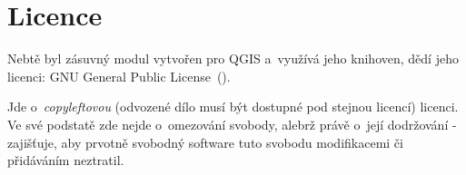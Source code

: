 \section{Licence}
\label{licence}

Nebtě byl zásuvný modul vytvořen pro QGIS a~využívá jeho knihoven, dědí jeho licenci: GNU General Public
License~(). 

Jde o~\textit{copyleftovou} (odvozené dílo musí být dostupné pod stejnou licencí)
licenci. Ve své podstatě zde nejde o~omezování svobody, alebrž právě o~její dodržování - zajišťuje,
aby prvotně svobodný software tuto svobodu modifikacemi či přidáváním neztratil. 



